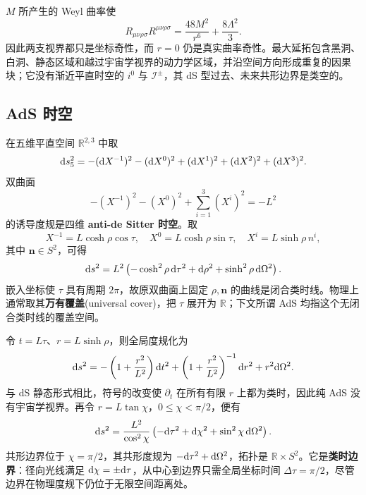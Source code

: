 $M$ 所产生的 Weyl 曲率使
\begin{equation}
    R_{\mu\nu\rho\sigma}R^{\mu\nu\rho\sigma}
      =\frac{48M^2}{r^6}+\frac{8\Lambda^2}{3}.
\end{equation}
因此两支视界都只是坐标奇性，而 $r=0$ 仍是真实曲率奇性。最大延拓包含黑洞、白洞、静态区域和越过宇宙学视界的动力学区域，并沿空间方向形成重复的因果块；它没有渐近平直时空的 $i^0$ 与 $\mathscr I^\pm$，其 dS 型过去、未来共形边界是类空的。

\subsection{AdS 时空}

在五维平直空间 $\mathbb R^{2,3}$ 中取
\[
    \dd s_5^2=-(\dd X^{-1})^2-(\dd X^0)^2
      +(\dd X^1)^2+(\dd X^2)^2+(\dd X^3)^2.
\]
双曲面
\begin{equation}
    -(X^{-1})^2-(X^0)^2+\sum_{i=1}^3(X^i)^2=-L^2
\end{equation}
的诱导度规是四维 \textbf{anti-de Sitter 时空}。取
\[
    X^{-1}=L\cosh\rho\cos\tau,\quad
    X^0=L\cosh\rho\sin\tau,
    \quad X^i=L\sinh\rho\,n^i,
\]
其中 $\bm n\in S^2$，可得
\begin{equation}
    \dd s^2=L^2\left(-\cosh^2\rho\,\dd\tau^2
      +\dd\rho^2+\sinh^2\rho\,\dd\Omega^2\right).
\end{equation}
嵌入坐标使 $\tau$ 具有周期 $2\pi$，故原双曲面上固定 $\rho,\bm n$ 的曲线是闭合类时线。物理上通常取其\textbf{万有覆盖}(universal cover)，把 $\tau$ 展开为 $\mathbb R$；下文所谓 AdS 均指这个无闭合类时线的覆盖空间。

令 $t=L\tau$、$r=L\sinh\rho$，则全局度规化为
\begin{equation}
    \dd s^2=-\left(1+\frac{r^2}{L^2}\right)\dd t^2
      +\left(1+\frac{r^2}{L^2}\right)^{-1}\dd r^2+r^2\dd\Omega^2.
\end{equation}
与 dS 静态形式相比，符号的改变使 $\partial_t$ 在所有有限 $r$ 上都为类时，因此纯 AdS 没有宇宙学视界。再令 $r=L\tan\chi$，$0\leqslant\chi<\pi/2$，便有
\begin{equation}
    \dd s^2=\frac{L^2}{\cos^2\chi}
      \left(-\dd\tau^2+\dd\chi^2+\sin^2\chi\,\dd\Omega^2\right).
\end{equation}
共形边界位于 $\chi=\pi/2$，其共形度规为 $-\dd\tau^2+\dd\Omega^2$，拓扑是 $\mathbb R\times S^2$。它是\textbf{类时边界}：径向光线满足 $\dd\chi=\pm\dd\tau$，从中心到边界只需全局坐标时间 $\Delta\tau=\pi/2$，尽管边界在物理度规下仍位于无限空间距离处。

